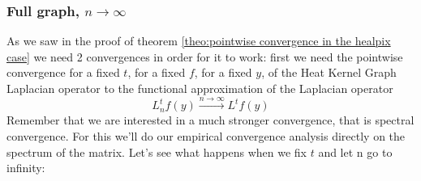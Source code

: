 \subsubsection{Full graph, $n\to\infty$}\label{sec:Chapter1: n to infty}
As we saw in the proof of theorem \ref{theo:pointwise convergence in the healpix case} we need 2 convergences in order for it to work: first we need the pointwise convergence for a fixed $t$, for a fixed $f$, for a fixed $y$, of the Heat Kernel Graph Laplacian operator to the functional approximation of the Laplacian operator 
$$L_n^tf(y)\xrightarrow{n\to\infty}L^tf(y)$$
Remember that we are interested in a much stronger convergence, that is spectral convergence. For this we'll do our empirical convergence analysis directly on the spectrum of the matrix. 
Let's see what happens when we fix $t$ and let n go to infinity:

